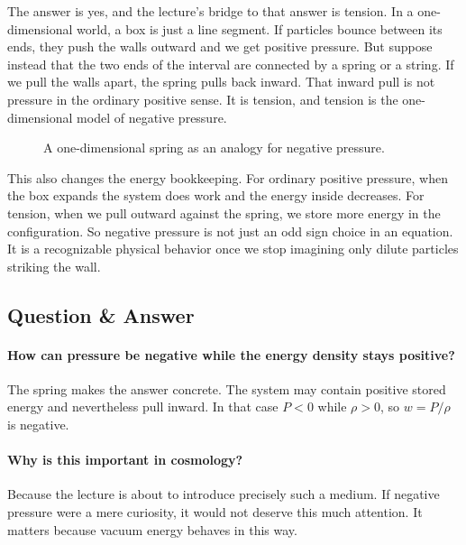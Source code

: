The answer is yes, and the lecture's bridge to that answer is tension. In a one-dimensional world, a box is just a line segment. If particles bounce between its ends, they push the walls outward and we get positive pressure. But suppose instead that the two ends of the interval are connected by a spring or a string. If we pull the walls apart, the spring pulls back inward. That inward pull is not pressure in the ordinary positive sense. It is tension, and tension is the one-dimensional model of negative pressure.

\begin{figure}[h]
\centering
{}
\caption{A one-dimensional spring as an analogy for negative pressure.}
\end{figure}

This also changes the energy bookkeeping. For ordinary positive pressure, when the box expands the system does work and the energy inside decreases. For tension, when we pull outward against the spring, we store more energy in the configuration. So negative pressure is not just an odd sign choice in an equation. It is a recognizable physical behavior once we stop imagining only dilute particles striking the wall.

\subsection{Question \& Answer}

\paragraph{How can pressure be negative while the energy density stays positive?} The spring makes the answer concrete. The system may contain positive stored energy and nevertheless pull inward. In that case \(P<0\) while \(\rho>0\), so \(w=P/\rho\) is negative.

\paragraph{Why is this important in cosmology?} Because the lecture is about to introduce precisely such a medium. If negative pressure were a mere curiosity, it would not deserve this much attention. It matters because vacuum energy behaves in this way.


